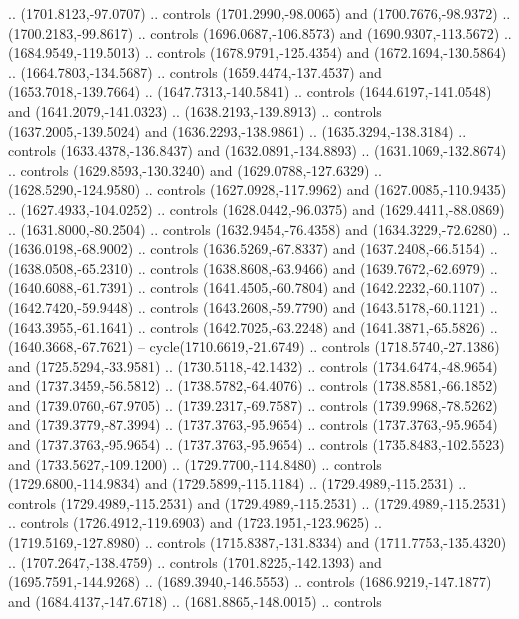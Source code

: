 \begin{scope}[shift={(-22.88722,-49.76189)}]
\begin{scope}[shift={(-739.46591,328.36782)}]
      .. (1701.8123,-97.0707) .. controls (1701.2990,-98.0065) and
      (1700.7676,-98.9372) .. (1700.2183,-99.8617) .. controls (1696.0687,-106.8573)
      and (1690.9307,-113.5672) .. (1684.9549,-119.5013) .. controls
      (1678.9791,-125.4354) and (1672.1694,-130.5864) .. (1664.7803,-134.5687) ..
      controls (1659.4474,-137.4537) and (1653.7018,-139.7664) ..
      (1647.7313,-140.5841) .. controls (1644.6197,-141.0548) and
      (1641.2079,-141.0323) .. (1638.2193,-139.8913) .. controls
      (1637.2005,-139.5024) and (1636.2293,-138.9861) .. (1635.3294,-138.3184) ..
      controls (1633.4378,-136.8437) and (1632.0891,-134.8893) ..
      (1631.1069,-132.8674) .. controls (1629.8593,-130.3240) and
      (1629.0788,-127.6329) .. (1628.5290,-124.9580) .. controls
      (1627.0928,-117.9962) and (1627.0085,-110.9435) .. (1627.4933,-104.0252) ..
      controls (1628.0442,-96.0375) and (1629.4411,-88.0869) .. (1631.8000,-80.2504)
      .. controls (1632.9454,-76.4358) and (1634.3229,-72.6280) ..
      (1636.0198,-68.9002) .. controls (1636.5269,-67.8337) and (1637.2408,-66.5154)
      .. (1638.0508,-65.2310) .. controls (1638.8608,-63.9466) and
      (1639.7672,-62.6979) .. (1640.6088,-61.7391) .. controls (1641.4505,-60.7804)
      and (1642.2232,-60.1107) .. (1642.7420,-59.9448) .. controls
      (1643.2608,-59.7790) and (1643.5178,-60.1121) .. (1643.3955,-61.1641) ..
      controls (1642.7025,-63.2248) and (1641.3871,-65.5826) .. (1640.3668,-67.7621)
      -- cycle(1710.6619,-21.6749) .. controls (1718.5740,-27.1386) and
      (1725.5294,-33.9581) .. (1730.5118,-42.1432) .. controls (1734.6474,-48.9654)
      and (1737.3459,-56.5812) .. (1738.5782,-64.4076) .. controls
      (1738.8581,-66.1852) and (1739.0760,-67.9705) .. (1739.2317,-69.7587) ..
      controls (1739.9968,-78.5262) and (1739.3779,-87.3994) .. (1737.3763,-95.9654)
      .. controls (1737.3763,-95.9654) and (1737.3763,-95.9654) ..
      (1737.3763,-95.9654) .. controls (1735.8483,-102.5523) and
      (1733.5627,-109.1200) .. (1729.7700,-114.8480) .. controls
      (1729.6800,-114.9834) and (1729.5899,-115.1184) .. (1729.4989,-115.2531) ..
      controls (1729.4989,-115.2531) and (1729.4989,-115.2531) ..
      (1729.4989,-115.2531) .. controls (1726.4912,-119.6903) and
      (1723.1951,-123.9625) .. (1719.5169,-127.8980) .. controls
      (1715.8387,-131.8334) and (1711.7753,-135.4320) .. (1707.2647,-138.4759) ..
      controls (1701.8225,-142.1393) and (1695.7591,-144.9268) ..
      (1689.3940,-146.5553) .. controls (1686.9219,-147.1877) and
      (1684.4137,-147.6718) .. (1681.8865,-148.0015) .. controls

\end{scope}
\end{scope}

